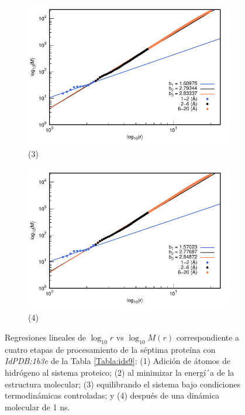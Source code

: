 \begin{figure}[H]
	\vspace{0cm} %
	
	\hspace{-0.3cm} 
	\begin{subfigure}{0.49\textwidth}
		\centering
		\includegraphics[width=\linewidth,page=1]{graphs/PDBs/1b3e/1b3eEq.pdf}
		\caption{(3)}
	\end{subfigure}
	\hspace{0.2cm}
	\begin{subfigure}{0.49\textwidth} %
		\centering
		\includegraphics[width=\linewidth,page=1]{graphs/PDBs/1b3e/1b3e1ns.pdf}
		\caption{(4)}
	\end{subfigure}
	\caption{Regresiones lineales de $\log_{10}r$ vs $\log_{10}M(r)$ correspondiente a cuatro etapas de procesamiento de la s\'{e}ptima prote\'{i}na con \textit{IdPDB:1b3e} de la Tabla \ref{Tabla:ids9}: (1) Adici\'{o}n de \'{a}tomos de hidr\'{o}geno al sistema proteico; (2) al minimizar la energ\'{i´}a de la estructura molecular; (3) equilibrando el sistema bajo condiciones termodin\'{a}micas controladas; y (4) despu\'{e}s de una din\'{a}mica molecular de 1 ns.}
	\label{fig:1b3e}
\end{figure}


